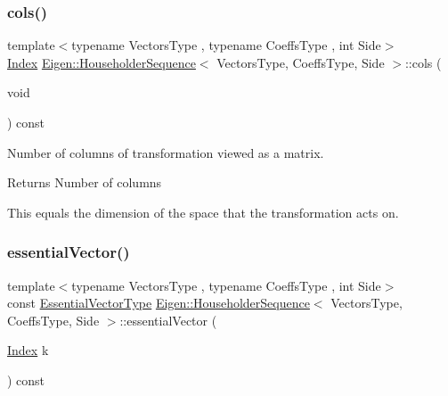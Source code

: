 \subsubsection{\texorpdfstring{cols()}{cols()}}
{\footnotesize\ttfamily template$<$typename Vectors\+Type , typename Coeffs\+Type , int Side$>$ \\
\mbox{\hyperlink{struct_eigen_1_1_eigen_base_a554f30542cc2316add4b1ea0a492ff02}{Index}} \mbox{\hyperlink{class_eigen_1_1_householder_sequence}{Eigen\+::\+Householder\+Sequence}}$<$ Vectors\+Type, Coeffs\+Type, Side $>$\+::cols (\begin{DoxyParamCaption}\item[{void}]{ }\end{DoxyParamCaption}) const\hspace{0.3cm}{\ttfamily [inline]}}



Number of columns of transformation viewed as a matrix. 

\begin{DoxyReturn}{Returns}
Number of columns
\end{DoxyReturn}
This equals the dimension of the space that the transformation acts on. \mbox{\label{class_eigen_1_1_householder_sequence_ac91cf37b0cbea9e504c89e021fd289ba}} 
\subsubsection{\texorpdfstring{essentialVector()}{essentialVector()}}
{\footnotesize\ttfamily template$<$typename Vectors\+Type , typename Coeffs\+Type , int Side$>$ \\
const \mbox{\hyperlink{class_eigen_1_1_block}{Essential\+Vector\+Type}} \mbox{\hyperlink{class_eigen_1_1_householder_sequence}{Eigen\+::\+Householder\+Sequence}}$<$ Vectors\+Type, Coeffs\+Type, Side $>$\+::essential\+Vector (\begin{DoxyParamCaption}\item[{\mbox{\hyperlink{struct_eigen_1_1_eigen_base_a554f30542cc2316add4b1ea0a492ff02}{Index}}}]{k }\end{DoxyParamCaption}) const\hspace{0.3cm}{\ttfamily [inline]}}



